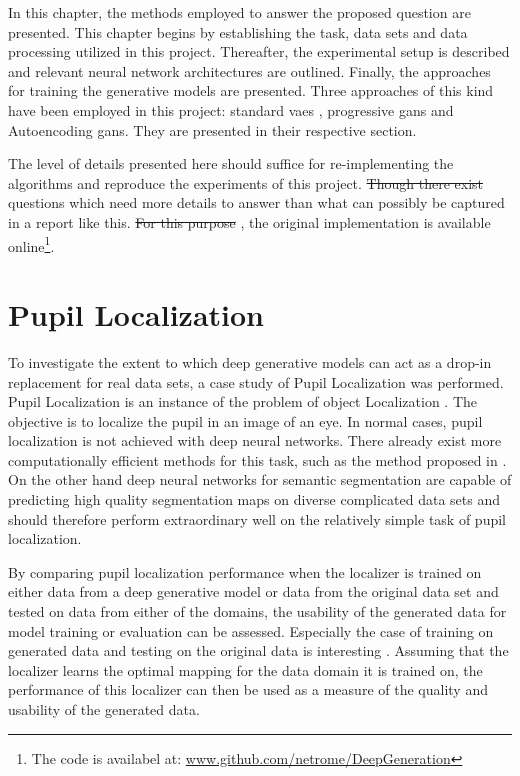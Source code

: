 In this chapter, the methods employed to answer the proposed question are presented. This chapter begins by establishing the task, data sets and data processing utilized in this project. Thereafter, the experimental setup is described and relevant neural network architectures are outlined. Finally, the approaches for training the generative models are presented. Three approaches of this kind have been employed in this project: standard \acrshort{vaes}  , progressive \acrshort{gans} and Autoencoding \acrshort{gans}. They are presented in their respective section. 

The level of details  presented here should suffice for re-implementing the algorithms and reproduce the experiments of this project. \st{Though there exist}  questions which need more details to answer than what can possibly be captured in a report like this. \st{For this purpose} , the original implementation is available online\footnote{The code is availabel at: \url{www.github.com/netrome/DeepGeneration}}.

\section{Pupil Localization}
To investigate the extent to which deep generative models can act as a drop-in replacement for real data sets, a case study of Pupil Localization  was performed. Pupil Localization is an instance of the problem of object Localization . The objective is to localize the pupil in an image of an eye. In normal cases, pupil localization is not achieved with deep neural networks. There already exist more computationally efficient methods for this task, such as the method proposed in \parencite{markuvs2014eye}. On the other hand \todoproofread{,} deep neural networks for semantic segmentation are capable of predicting high quality segmentation maps on diverse complicated data sets \parencite{ChenPK0Y16semantic} and should therefore perform extraordinary well on the relatively simple task of pupil localization.

By comparing pupil localization performance when the localizer is trained on either data from a deep generative model or data from the original data set and tested on data from either of the domains, the usability of the generated data for model training or evaluation can be assessed. Especially the case of training on generated data and testing on the original data is interesting . Assuming that the localizer learns the optimal mapping for the data domain it is trained on, the performance of this localizer can then be used as a measure of the quality and usability of the generated data. 

